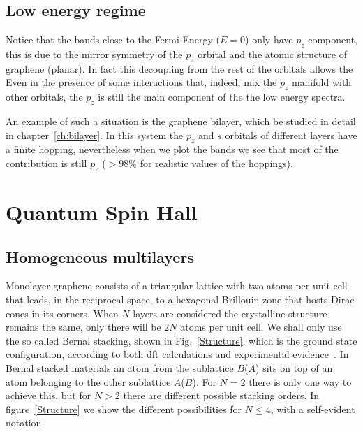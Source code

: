 \subsection{Low energy regime}
Notice that the bands close to the Fermi Energy ($E=0$) only have $p_z$ component, this is due to the mirror symmetry of the $p_z$ orbital and the atomic structure of graphene (planar). In fact this decoupling from the rest of the orbitals allows the
Even in the presence of some interactions that, indeed, mix the $p_z$ manifold with other orbitals, the $p_z$ is still the main component of the the low energy spectra.

An example of such a situation is the graphene bilayer, which be studied in detail in chapter~\ref{ch:bilayer}. In this system the $p_z$ and $s$ orbitals of different layers have a finite hopping, nevertheless when we plot the bands %
we see that most of the contribution is still $p_z$ ($>98\%$ for realistic values of the hoppings).



\section{Quantum Spin Hall}
\subsection{Homogeneous multilayers}\label{Homogeneous}

Monolayer graphene consists of a triangular lattice with two atoms per unit cell that leads, in the reciprocal space, to a hexagonal Brillouin zone that hosts Dirac cones in its corners.
When $N$ layers are considered the crystalline structure remains the same, only there will be $2N$ atoms per unit cell. We shall only use the so called Bernal stacking, shown in  Fig.~\ref{Structure}, which is the ground state configuration, according to both \ac{dft} calculations and experimental evidence~\cite{Norimatsu2010,Charlier1994,Charlier1994a}. In Bernal stacked materials an atom from the sublattice $B$($A$) sits on top of an atom belonging to the other sublattice $A$($B$).
For $N=2$ there is only one way to achieve this, but for $N>2$ there are different possible stacking orders. In figure~\ref{Structure} we show the different possibilities for $N\leq4$, with a self-evident notation.

